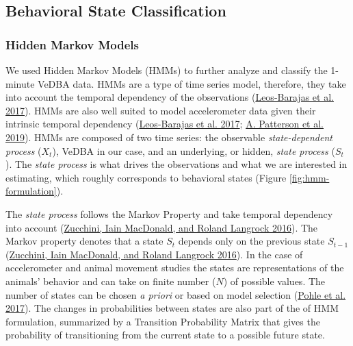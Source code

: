 \documentclass[english,msc,numbers,hidelinks]{coppe}
\begin{document}
  \hypertarget{behavioral-state-classification}{%
  \subsection{Behavioral State Classification}\label{behavioral-state-classification}}

  \hypertarget{hidden-markov-models}{%
  \subsubsection{Hidden Markov Models}\label{hidden-markov-models}}

  We used Hidden Markov Models (HMMs) to further analyze and classify the 1-minute VeDBA data. HMMs are a type of time series model, therefore, they take into account the temporal dependency of the observations (\protect\hyperlink{ref-leosbarajas2017}{Leos-Barajas et al. 2017}). HMMs are also well suited to model accelerometer data given their intrinsic temporal dependency (\protect\hyperlink{ref-leosbarajas2017}{Leos-Barajas et al. 2017}; \protect\hyperlink{ref-patterson2019}{A. Patterson et al. 2019}). HMMs are composed of two time series: the observable \emph{state-dependent process} (\(X_t\)), VeDBA in our case, and an underlying, or hidden, \emph{state process} (\(S_t\)). The \emph{state process} is what drives the observations and what we are interested in estimating, which roughly corresponds to behavioral states (Figure \ref{fig:hmm-formulation}).

  The \emph{state process} follows the Markov Property and take temporal dependency into account (\protect\hyperlink{ref-zucchini2016}{Zucchini, Iain MacDonald, and Roland Langrock 2016}). The Markov property denotes that a state \(S_t\) depends only on the previous state \(S_{t-1}\) (\protect\hyperlink{ref-zucchini2016}{Zucchini, Iain MacDonald, and Roland Langrock 2016}). In the case of accelerometer and animal movement studies the states are representations of the animals' behavior and can take on finite number (\(N\)) of possible values. The number of states can be chosen \emph{a priori} or based on model selection (\protect\hyperlink{ref-pohle2017}{Pohle et al. 2017}). The changes in probabilities between states are also part of the of HMM formulation, summarized by a Transition Probability Matrix that gives the probability of transitioning from the current state to a possible future state.
\end{document}
